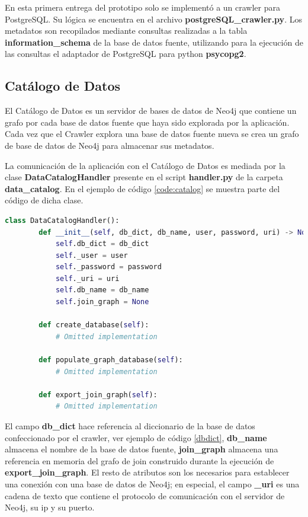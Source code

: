 En esta primera entrega del prototipo solo se implement\'o a un crawler para PostgreSQL. Su l\'ogica 
se encuentra en el archivo \textbf{postgreSQL\_crawler.py}. Los metadatos son recopilados mediante consultas 
realizadas
a la tabla \textbf{information\_schema} de la base de datos fuente, utilizando para la ejecución de las consultas 
el adaptador de PostgreSQL para python \textbf{psycopg2}.




\subsection{Catálogo de Datos}

El Catálogo de Datos es un servidor de bases de datos de Neo4j que contiene un grafo por cada base de datos 
fuente que haya sido explorada por la aplicación. Cada vez que el Crawler explora una base de datos fuente nueva se crea 
un grafo de base de datos de Neo4j para almacenar sus metadatos.

La comunicación de la aplicación con el Catálogo de Datos es mediada por la clase \textbf{DataCatalogHandler} 
presente en el script \textbf{handler.py} de la carpeta \textbf{data\_catalog}. En el ejemplo de c\'odigo 
\ref{code:catalog} se muestra parte del código de dicha clase.

\begin{lstlisting}[label={code:catalog}, caption={Clase DataCatalogHandler}, language={python}]
    class DataCatalogHandler():
        def __init__(self, db_dict, db_name, user, password, uri) -> None:
            self.db_dict = db_dict
            self._user = user
            self._password = password
            self._uri = uri
            self.db_name = db_name
            self.join_graph = None

        def create_database(self):
            # Omitted implementation

        def populate_graph_database(self):
            # Omitted implementation

        def export_join_graph(self):
            # Omitted implementation

\end{lstlisting}

El campo \textbf{db\_dict} hace referencia al diccionario de la base de datos confeccionado por el crawler, ver ejemplo de c\'odigo \ref{dbdict}, 
\textbf{db\_name} almacena el  
nombre de la base de datos fuente, \textbf{join\_graph} almacena una referencia en memoria del grafo de join construido 
durante la ejecución de \textbf{export\_join\_graph}. El resto de atributos 
son los necesarios para establecer una conexión con una base de datos de Neo4j; en especial, el campo \textbf{\_uri} 
es una cadena de texto que contiene el protocolo de comunicación con el servidor de Neo4j, su ip y su puerto. 

